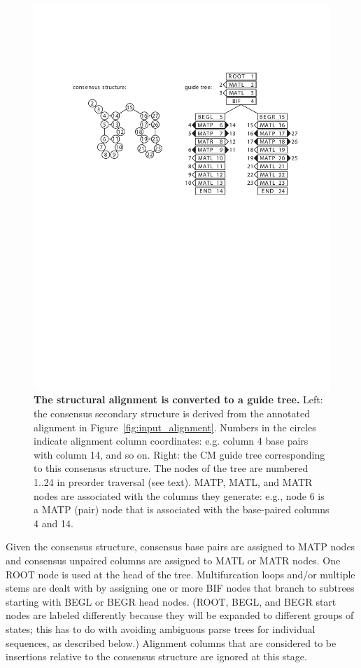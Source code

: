 \begin{figure}[t]
\begin{center}
\includegraphics[width=5in]{Figures/cm_nodetree}
\end{center}
\caption{\small\textbf{The structural alignment is converted to a guide
tree.} Left: the consensus secondary structure is derived from the
annotated alignment in Figure~\ref{fig:input_alignment}. Numbers in
the circles indicate alignment column coordinates: e.g.  column 4 base
pairs with column 14, and so on. Right: the CM guide tree
corresponding to this consensus structure. The nodes of the tree are
numbered 1..24 in preorder traversal (see text). MATP, MATL, and MATR
nodes are associated with the columns they generate: e.g., node 6 is a
MATP (pair) node that is associated with the base-paired columns 4 and
14.}
\label{fig:cm_nodetree}
\end{figure}

Given the consensus structure, consensus base pairs are assigned to
MATP nodes and consensus unpaired columns are assigned to MATL or MATR
nodes. One ROOT node is used at the head of the tree.  Multifurcation
loops and/or multiple stems are dealt with by assigning one or more
BIF nodes that branch to subtrees starting with BEGL or BEGR head
nodes. (ROOT, BEGL, and BEGR start nodes are labeled differently
because they will be expanded to different groups of states; this has
to do with avoiding ambiguous parse trees for individual sequences, as
described below.) Alignment columns that are considered to be
insertions relative to the consensus structure are ignored at this
stage.

